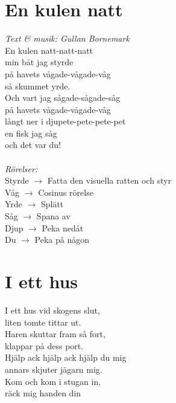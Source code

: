 \section{En kulen natt}
\textit{Text \& musik: Gullan Bornemark}
\vspace{2mm}\\
En kulen natt-natt-natt\\
min båt jag styrde\\
på havets vågade-vågade-våg\\
så skummet yrde.\\
Och vart jag sågade-sågade-såg\\
på havets vågade-vågade-våg\\
långt ner i djupete-pete-pete-pet\\
en fisk jag såg\\
och det var du!\\
\\
\textit{Rörelser:}\\
Styrde $\rightarrow$ Fatta den visuella ratten och styr\\
Våg $\rightarrow$ Cosinus rörelse\\
Yrde $\rightarrow$ Splätt\\
Såg $\rightarrow$ Spana av\\
Djup $\rightarrow$ Peka nedåt\\
Du $\rightarrow$ Peka på någon

\section{I ett hus}
I ett hus vid skogens slut,\\
liten tomte tittar ut.\\
Haren skuttar fram så fort,\\
klappar på dess port.\\
Hjälp ack hjälp ack hjälp du mig\\
annars skjuter jägarn mig.\\
Kom och kom i stugan in,\\
räck mig handen din

\newpage
